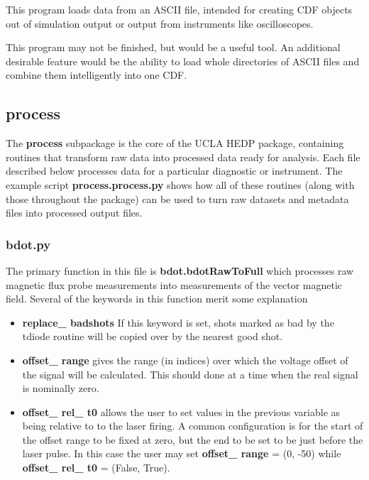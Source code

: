 \documentclass[12pt]{article}
\newcommand{\loc}[1]{{\bf \fontfamily{pcr}\selectfont #1}}
\newcommand{\todo}[1]{ \begin{tcolorbox} \centering  #1 \end{tcolorbox}}
\begin{document}
This program loads data from an ASCII file, intended for creating CDF objects out of simulation output or output from instruments like oscilloscopes. 

\todo{This program may not be finished, but would be a useful tool. An additional desirable feature would be the ability to load whole directories of ASCII files and combine them intelligently into one CDF.}


\subsection{\loc{process}}

The \loc{process} subpackage is the core of the UCLA HEDP package, containing routines that transform raw data into processed data ready for analysis. Each file described below processes data for a particular diagnostic or instrument. The example script \loc{process.process.py} shows how all of these routines (along with those throughout the package) can be used to turn raw datasets and metadata files into processed output files.

\subsubsection{\loc{bdot.py}}

The primary function in this file is \loc{bdot.bdotRawToFull} which processes raw magnetic flux probe measurements into measurements of the vector magnetic field. Several of the keywords in this function merit some explanation

\begin{itemize}
\item \loc{replace\_ badshots} If this keyword is set, shots marked as bad by the tdiode routine will be copied over by the nearest good shot.

\item \loc{offset\_ range} gives the range (in indices) over which the voltage offset of the signal will be calculated. This should done at a time when the real signal is nominally zero. 

\item \loc{offset\_ rel\_ t0} allows the user to set values in the previous variable as being relative to to the laser firing. A common configuration is for the start of the offset range to be fixed at zero, but the end to be set to be just before the laser pulse. In this case the user may set \loc{offset\_ range} = (0, -50) while \loc{offset\_ rel\_ t0} = (False, True). 
\end{itemize}
\end{document}
